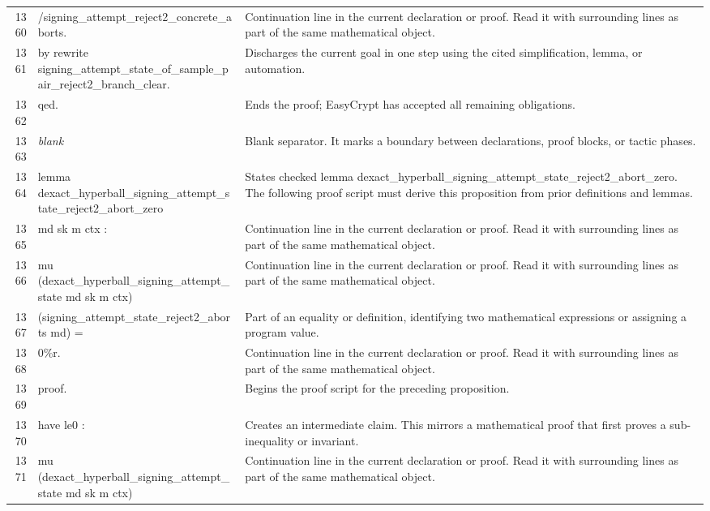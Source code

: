 \documentclass[10pt]{article}
\begin{document}
\begin{longtable}{r L{0.53\textwidth} L{0.37\textwidth}}
1360 & {\ttfamily\scriptsize         /signing\_attempt\_reject2\_concrete\_aborts.} & Continuation line in the current declaration or proof.  Read it with surrounding lines as part of the same mathematical object. \\
1361 & {\ttfamily\scriptsize by rewrite signing\_attempt\_state\_of\_sample\_pair\_reject2\_branch\_clear.} & Discharges the current goal in one step using the cited simplification, lemma, or automation. \\
1362 & {\ttfamily\scriptsize qed.} & Ends the proof; EasyCrypt has accepted all remaining obligations. \\
1363 & {\ttfamily\scriptsize \emph{blank}} & Blank separator.  It marks a boundary between declarations, proof blocks, or tactic phases. \\
1364 & {\ttfamily\scriptsize lemma dexact\_hyperball\_signing\_attempt\_state\_reject2\_abort\_zero} & States checked lemma dexact\_hyperball\_signing\_attempt\_state\_reject2\_abort\_zero.  The following proof script must derive this proposition from prior definitions and lemmas. \\
1365 & {\ttfamily\scriptsize   md sk m ctx :} & Continuation line in the current declaration or proof.  Read it with surrounding lines as part of the same mathematical object. \\
1366 & {\ttfamily\scriptsize   mu (dexact\_hyperball\_signing\_attempt\_state md sk m ctx)} & Continuation line in the current declaration or proof.  Read it with surrounding lines as part of the same mathematical object. \\
1367 & {\ttfamily\scriptsize     (signing\_attempt\_state\_reject2\_aborts md) =} & Part of an equality or definition, identifying two mathematical expressions or assigning a program value. \\
1368 & {\ttfamily\scriptsize   0\%r.} & Continuation line in the current declaration or proof.  Read it with surrounding lines as part of the same mathematical object. \\
1369 & {\ttfamily\scriptsize proof.} & Begins the proof script for the preceding proposition. \\
1370 & {\ttfamily\scriptsize have le0 :} & Creates an intermediate claim.  This mirrors a mathematical proof that first proves a sub-inequality or invariant. \\
1371 & {\ttfamily\scriptsize   mu (dexact\_hyperball\_signing\_attempt\_state md sk m ctx)} & Continuation line in the current declaration or proof.  Read it with surrounding lines as part of the same mathematical object. \\

\end{longtable}
\end{document}
